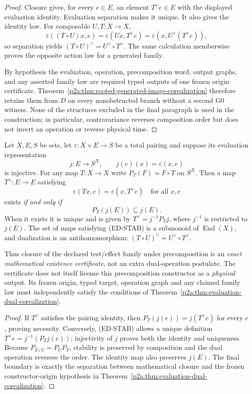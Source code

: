 \documentclass[12pt,a4paper]{article}
\begin{document}
\begin{proof}
Closure gives, for every \(e\in E\), an element \(T^\vee e\in E\) with the
displayed evaluation identity.  Evaluation separation makes it unique.  It
also gives the identity law.  For composable \(U,T:X\to X\),
\[
 \varepsilon((T\circ U)x,e)
 =\varepsilon(Ux,T^\vee e)
 =\varepsilon(x,U^\vee(T^\vee e)),
\]
so separation yields
\((T\circ U)^\vee=U^\vee\circ T^\vee\).
The same calculation memberwise proves the opposite action law for a
generated family.

By hypothesis the evaluation, operation, precomposition word, output graphs,
and any asserted family law are required typed outputs of one frozen origin
certificate.  Theorem~\ref{p2a:thm:rooted-generated-image-corealization}
therefore retains them from \(D\) on every nonobstructed branch without a
second G0 witness.  None of the structures excluded in the final paragraph
is used in the construction; in particular, contravariance reverses
composition order but does not invert an operation or reverse physical time.
\end{proof}


\begin{theorem}
\label{p2a:thm:v280-evaluation-dual-stabilizer}
Let $X,E,S$ be sets, let $\varepsilon:X\times E\to S$ be a total
pairing and suppose its evaluation representation
\[
 j:E\longrightarrow S^X,\qquad j(e)(x)=\varepsilon(x,e)
\]
is injective.  For any map $T:X\to X$ write
$P_T(F)=F\circ T$ on $S^X$.  Then a map $T^\vee:E\to E$ satisfying
\[
 \varepsilon(Tx,e)=\varepsilon(x,T^\vee e)
 \quad\text{for all }x,e
\]
exists \emph{if and only if}
\[
 \boxed{P_T(j(E))\subseteq j(E).} \tag{ED-STAB}
\]
When it exists it is unique and is given by
$T^\vee=j^{-1}P_Tj$, where $j^{-1}$ is restricted to $j(E)$.
The set of maps satisfying \textup{(ED-STAB)} is a submonoid of
$\operatorname{End}(X)$, and dualization is an antihomomorphism:
$(T\circ U)^\vee=U^\vee\circ T^\vee$.

Thus closure of the declared test/effect family under precomposition is an
\emph{exact mathematical existence certificate}, not an extra dual-operation
postulate.  The certificate does not itself license this precomposition
constructor as a \emph{physical} output.  Its frozen origin, typed target,
operation graph and any claimed family law must independently satisfy the
conditions of Theorem~\ref{p2a:thm:evaluation-dual-corealization}.
\end{theorem}
\begin{proof}
If $T^\vee$ satisfies the pairing identity, then
$P_T(j(e))=j(T^\vee e)$ for every $e$, proving necessity.  Conversely,
\textup{(ED-STAB)} allows a unique definition
$T^\vee e=j^{-1}(P_Tj(e))$; injectivity of $j$ proves both the identity
and uniqueness.  Because $P_{T\circ U}=P_UP_T$, stability is preserved by
composition and the dual operation reverses the order.  The identity map
also preserves $j(E)$.  The final boundary is exactly the separation
between mathematical closure and the frozen constructor-origin hypothesis
in Theorem~\ref{p2a:thm:evaluation-dual-corealization}.
\end{proof}
\end{document}
